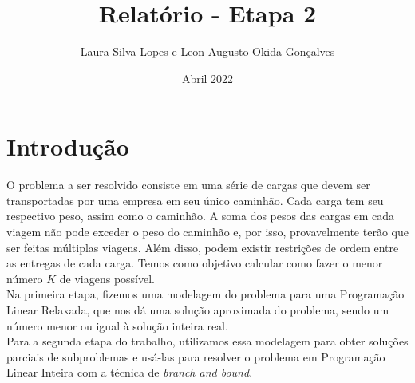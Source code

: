 \documentclass{article}
\title{Relatório - Etapa 2}
\author{Laura Silva Lopes e Leon Augusto Okida Gonçalves}
\date{Abril 2022}
\begin{document}
\maketitle

\section{Introdução}
O problema a ser resolvido consiste em uma série de cargas que devem ser transportadas por uma empresa em seu único caminhão. Cada carga tem seu respectivo peso, assim como o caminhão. A soma dos pesos das cargas em cada viagem não pode exceder o peso do caminhão e, por isso, provavelmente terão que ser feitas múltiplas viagens. Além disso, podem existir restrições de ordem entre as entregas de cada carga. Temos como objetivo calcular como fazer o menor número $K$ de viagens possível.\\
Na primeira etapa, fizemos uma modelagem do problema para uma Programação Linear Relaxada, que nos dá uma solução aproximada do problema, sendo um número menor ou igual à solução inteira real. \\
Para a segunda etapa do trabalho, utilizamos essa modelagem para obter soluções parciais de subproblemas e usá-las para resolver o problema em Programação Linear Inteira com a técnica de \textit{branch and bound}. \\

\newpage
\end{document}
